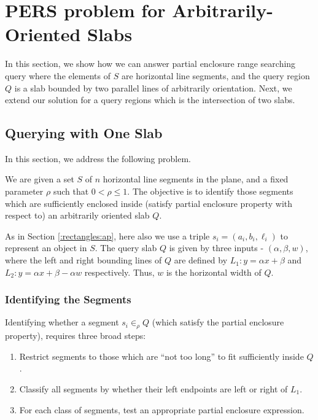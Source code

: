 \section{PERS problem for Arbitrarily-Oriented Slabs}
\label{:slabs}

In this section, we show how we can answer partial enclosure range searching 
query 
where the elements of $S$ are horizontal line segments, and the query region 
$Q$ 
is a slab bounded by two parallel lines of arbitrarily orientation. Next, we 
extend 
our solution for a query regions which is the intersection of two slabs. 

\subsection{Querying with One Slab}
\label{:slabs:one}
In this section, we address the following problem. 
\begin{problem}
We are given a set $S$ of $n$ horizontal line segments in the 
plane, and a fixed parameter $\rho$ such that $0 < \rho \leq 1$. 
The objective is to identify those segments which are sufficiently 
enclosed inside (satisfy partial enclosure property with respect 
to) an arbitrarily oriented slab $Q$.
\end{problem}

As in Section \ref{:rectangles:ap}, here also we use a triple 
$s_i=(a_i,b_i,\ell_i)$ to represent an object in $S$. The 
query slab $Q$ is given by three inputs - $(\alpha, \beta, w)$,  
where the left and right bounding lines of $Q$ are defined by 
$L_1 : y = \alpha x + \beta$ and $L_2: y = \alpha x + \beta - 
\alpha w$ respectively. Thus, $w$ is the horizontal width of $Q$.

\subsubsection{Identifying the Segments}
\label{:slabs:one:approach}
Identifying whether a segment $s_i \in_\rho Q$ (which satisfy the partial 
enclosure property), requires three broad steps:

\begin{enumerate}
\item Restrict segments to those which are ``not too long'' to fit 
sufficiently inside $Q$.
\item Classify all segments by whether their left endpoints are 
left or right of $L_1$.
\item For each class of segments, test an appropriate partial 
enclosure expression.
\end{enumerate}

